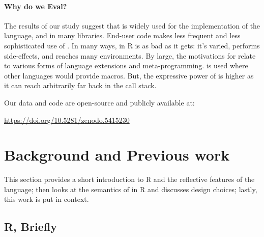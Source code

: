 \documentclass[acmsmall, screen]{acmart}
\begin{document}
\paragraph{Why do we Eval?} The results of our study suggest
that \eval is widely used for the implementation of the language, and in many
libraries. End-user code makes less frequent and less sophisticated use of
\eval. In many ways, \eval in R is as bad as it gets: it's varied, performs
side-effects, and reaches many environments. By large, the motivations for
\eval relate to various forms of language extensions and meta-programming. \Eval
is used where other languages would provide macros. But, the expressive power of
\eval is higher as it can reach arbitrarily far back in the call stack.

\medskip

Our data and code are
open-source and publicly available at:

\begin{center}
  \url{https://doi.org/10.5281/zenodo.5415230}
\end{center}



\section{Background and Previous work}

This section provides a short introduction to R and the reflective features of
the language; then looks at the semantics of \eval in R and discusses design
choices; lastly, this work is put in context.

\subsection{R, Briefly}
\end{document}
